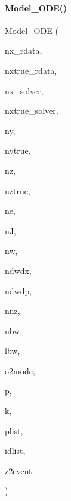 \paragraph{\texorpdfstring{Model\_ODE()}{Model\_ODE()}\hspace{0.1cm}{\footnotesize\ttfamily [2/2]}}
{\footnotesize\ttfamily \mbox{\hyperlink{classamici_1_1_model___o_d_e}{Model\+\_\+\+O\+DE}} (\begin{DoxyParamCaption}\item[{const int}]{nx\+\_\+rdata,  }\item[{const int}]{nxtrue\+\_\+rdata,  }\item[{const int}]{nx\+\_\+solver,  }\item[{const int}]{nxtrue\+\_\+solver,  }\item[{const int}]{ny,  }\item[{const int}]{nytrue,  }\item[{const int}]{nz,  }\item[{const int}]{nztrue,  }\item[{const int}]{ne,  }\item[{const int}]{nJ,  }\item[{const int}]{nw,  }\item[{const int}]{ndwdx,  }\item[{const int}]{ndwdp,  }\item[{const int}]{nnz,  }\item[{const int}]{ubw,  }\item[{const int}]{lbw,  }\item[{const \mbox{\hyperlink{namespaceamici_a2d77779286167d5603a870bf9f6c21ba}{Second\+Order\+Mode}}}]{o2mode,  }\item[{std\+::vector$<$ \mbox{\hyperlink{namespaceamici_a1bdce28051d6a53868f7ccbf5f2c14a3}{realtype}} $>$ const \&}]{p,  }\item[{std\+::vector$<$ \mbox{\hyperlink{namespaceamici_a1bdce28051d6a53868f7ccbf5f2c14a3}{realtype}} $>$ const \&}]{k,  }\item[{std\+::vector$<$ int $>$ const \&}]{plist,  }\item[{std\+::vector$<$ \mbox{\hyperlink{namespaceamici_a1bdce28051d6a53868f7ccbf5f2c14a3}{realtype}} $>$ const \&}]{idlist,  }\item[{std\+::vector$<$ int $>$ const \&}]{z2event }\end{DoxyParamCaption})}

